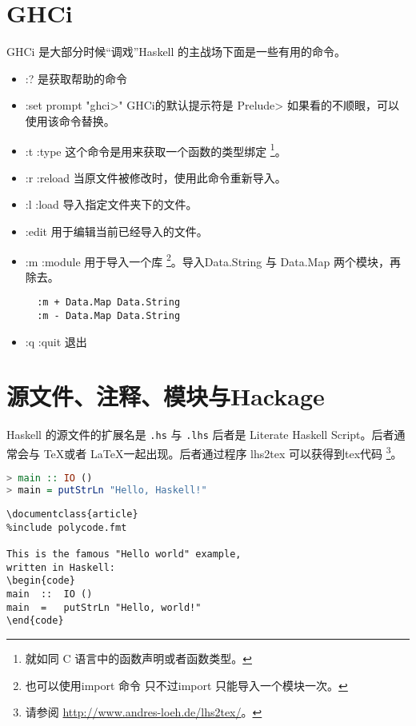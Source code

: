 \section{GHCi}
GHCi 是大部分时候“调戏”Haskell 的主战场下面是一些有用的命令。
\begin{itemize}
	\item :? 是获取帮助的命令
	\item :set prompt "ghci>" GHCi的默认提示符是 Prelude> 如果看的不顺眼，可以使用该命令替换。
	\item :t :type 这个命令是用来获取一个函数的类型绑定 \footnote{就如同 C 语言中的函数声明或者函数类型。}。
	\item :r :reload 当原文件被修改时，使用此命令重新导入。
	\item :l :load 导入指定文件夹下的文件。
	\item :edit 用于编辑当前已经导入的文件。
	\item :m :module 用于导入一个库 \footnote{也可以使用import 命令 只不过import 只能导入一个模块一次。}。导入Data.String 与 Data.Map 两个模块，再除去。
\begin{lstlisting}
  :m + Data.Map Data.String
  :m - Data.Map Data.String
\end{lstlisting}
	\item :q :quit 退出
\end{itemize}
\section{源文件、注释、模块与Hackage}
Haskell 的源文件的扩展名是 \verb".hs" 与 \verb".lhs" 后者是 Literate Haskell Script。后者通常会与 \TeX 或者 \LaTeX 一起出现。后者通过程序 lhs2tex 可以获得到tex代码 \footnote{请参阅 \url{http://www.andres-loeh.de/lhs2tex/}。}。
\begin{lstlisting}[language=Haskell,caption={lhs示例}]
> main :: IO ()
> main = putStrLn "Hello, Haskell!"
\end{lstlisting}



\begin{lstlisting}[language={[LaTeX]TeX},caption={lhs示例}]
\documentclass{article}
%include polycode.fmt

This is the famous "Hello world" example,
written in Haskell:
\begin{code}
main  ::  IO ()
main  =   putStrLn "Hello, world!"
\end{code}

\end{lstlisting}

